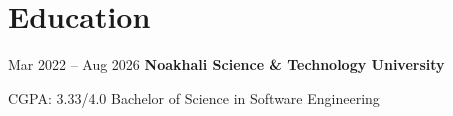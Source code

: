 \section{Education}

\begin{twocolentry}{Mar 2022 -- Aug 2026}
    \textbf{Noakhali Science \& Technology University}
\end{twocolentry}

\begin{twocolentry}{CGPA: 3.33/4.0}
    Bachelor of Science in Software Engineering
\end{twocolentry}